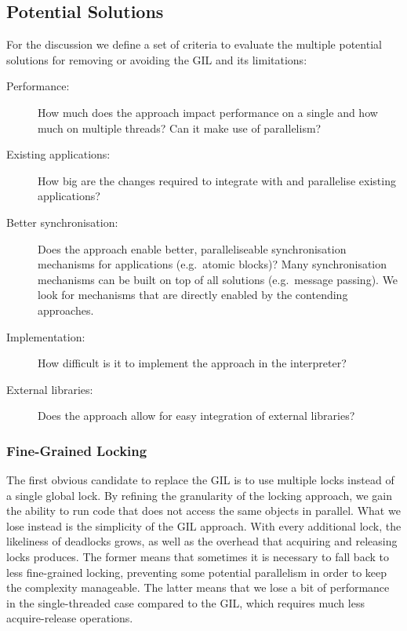 \documentclass{sigplanconf}
\begin{document}
\subsection{Potential Solutions}
\label{sec:pot_solutions}

For the discussion we define a set of criteria to evaluate the
multiple potential solutions for removing or avoiding the GIL and its
limitations:

\begin{description}
\item[Performance:] How much does the approach impact performance on a single
  and how much on multiple threads? Can it make use of parallelism?
\item[Existing applications:] How big are the changes required to
  integrate with and parallelise existing applications?
\item[Better synchronisation:] Does the approach enable better,
  paralleliseable synchronisation mechanisms for applications
  (e.g.\ atomic blocks)?  Many synchronisation mechanisms can be built on
  top of all solutions (e.g.\  message passing). We look for mechanisms
  that are directly enabled by the contending approaches.
\item[Implementation:] How difficult is it to implement the approach
  in the interpreter?
\item[External libraries:] Does the approach allow for easy
  integration of external libraries?
\end{description}


\subsubsection{Fine-Grained Locking}

The first obvious candidate to replace the GIL is to use multiple
locks instead of a single global lock. By refining the granularity of
the locking approach, we gain the ability to run code that does not
access the same objects in parallel. What we lose instead is the
simplicity of the GIL approach. With every additional lock, the
likeliness of deadlocks grows, as well as the overhead that acquiring
and releasing locks produces. The former means that sometimes it is
necessary to fall back to less fine-grained locking, preventing some
potential parallelism in order to keep the complexity manageable.
The latter means that we lose a bit of performance in the
single-threaded case compared to the GIL, which requires much less
acquire-release operations.
\end{document}
